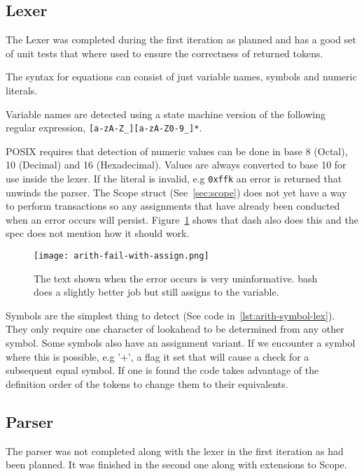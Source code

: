 \newpage %
\subsection{Lexer}
The Lexer was completed during the first iteration as planned and has a good set of unit tests that where used to ensure the correctness of returned tokens.

The syntax for equations can consist of just variable names, symbols and numeric literals.

Variable names are detected using a state machine version of the following regular expression, \verb![a-zA-Z_][a-zA-Z0-9_]*!.

POSIX requires that detection of numeric values can be done in base 8 (Octal), 10 (Decimal) and 16 (Hexadecimal).
Values are always converted to base 10 for use inside the lexer.
If the literal is invalid, e.g \verb!0xffk! an error is returned that unwinds the parser.
The Scope struct (See~\ref{sec:scope}) does not yet have a way to perform transactions so any assignments that have already been conducted when an error occurs will persist.
Figure~\ref{fig:arith-assign-fail} shows that dash also does this and the spec does not mention how it should work.

\begin{figure}[hp]
    \centering
    \texttt{[image: arith-fail-with-assign.png]}
    \caption[Dash assignment even with an error]{The text shown when the error occurs is very uninformative. bash does a slightly better job but still assigns to the variable.}
    \label{fig:arith-assign-fail}
\end{figure}

Symbols are the simplest thing to detect (See code in~\ref{lst:arith-symbol-lex}).
They only require one character of lookahead to be determined from any other symbol.
Some symbols also have an assignment variant.
If we encounter a symbol where this is possible, e.g '+',  a flag it set that will cause a check for a subsequent equal symbol.
If one is found the code takes advantage of the definition order of the tokens to change them to their equivalents.

\subsection{Parser}
The parser was not completed along with the lexer in the first iteration as had been planned.
It was finished in the second one along with extensions to Scope.


